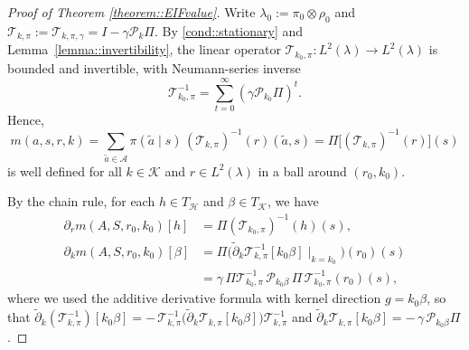 \documentclass[11pt]{article}
\newcommand{\adk}{\widetilde{\partial}_k}
\theoremstyle{plain}
\begin{document}
 \begin{proof}[Proof of Theorem \ref{theorem::EIFvalue}]

Write $\lambda_0 := \pi_0 \otimes \rho_0$ and $\mathcal{T}_{k,\pi} := \mathcal{T}_{k,\pi,\gamma} = I - \gamma \mathcal{P}_k \Pi$. By \ref{cond::stationary} and Lemma~\ref{lemma::invertibility}, the linear operator $\mathcal{T}_{k_0,\pi}:L^2(\lambda) \rightarrow L^2(\lambda)$ is bounded and invertible, with Neumann-series inverse
\[
\mathcal{T}_{k_0,\pi}^{-1} = \sum_{t=0}^\infty (\gamma \mathcal{P}_{k_0}\Pi)^t.
\]
Hence,
\[
m(a,s,r,k) 
= \sum_{\tilde a \in \mathcal{A}} \pi(\tilde a \mid s)\, (\mathcal{T}_{k,\pi})^{-1}(r)(\tilde a,s) 
= \Pi \bigl[(\mathcal{T}_{k,\pi})^{-1}(r)\bigr](s)
\]
is well defined for all $k \in \mathcal{K}$ and $r \in L^2(\lambda)$ in a ball around $(r_0, k_0)$.
 

By the chain rule, for each \(h \in T_{\mathcal{H}}\) and \(\beta \in T_{\mathcal{K}}\), we have
\begin{align*}
    \partial_r m(A,S,r_0,k_0)[h] 
    &= \Pi (\mathcal{T}_{k_0,\pi})^{-1}(h)(s), \\
    \partial_k m(A,S,r_0,k_0)[\beta] 
    &= \Pi  \bigl(\adk \mathcal{T}_{k,\pi}^{-1}[k_0\beta] \mid_{k = k_0} \bigr)(r_0)(s) \\
    &= \gamma\, \Pi \mathcal{T}_{k_0,\pi}^{-1}\,\mathcal{P}_{k_0\beta}\,\Pi\,\mathcal{T}_{k_0,\pi}^{-1}(r_0)(s),
\end{align*}
where we used the additive derivative formula with kernel direction \(g = k_0\beta\), so that \(\adk(\mathcal{T}_{k,\pi}^{-1})[k_0\beta] = -\,\mathcal{T}_{k,\pi}^{-1}\big(\adk \mathcal{T}_{k,\pi}[k_0\beta]\big)\mathcal{T}_{k,\pi}^{-1}\) and \(\adk \mathcal{T}_{k,\pi}[k_0\beta] = -\,\gamma\,\mathcal{P}_{k_0\beta}\Pi\). 

 



\end{proof}
\end{document}
